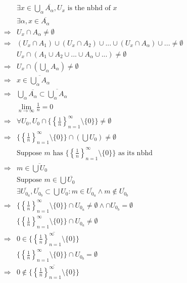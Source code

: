 \documentclass{article}
\begin{document}
\begin{equation*}
    \begin{split}
        &\exists x\in \bigcup_\alpha\overline{A_\alpha},U_x\text{ is the nbhd of }x\\
        &\exists \alpha,x\in \overline{A_\alpha}\\
        \Rightarrow&U_x\cap A_\alpha\ne\emptyset\\
        \Rightarrow&(U_x\cap A_1)\cup(U_x\cap A_2)\cup...\cup(U_x\cap A_\alpha)\cup...\ne\emptyset\\
        &U_x\cap(A_1\cup A_2\cup...\cup A_\alpha\cup ...)\ne\emptyset\\
        \Rightarrow&U_x\cap(\bigcup_\alpha A_\alpha)\ne\emptyset\\
        \Rightarrow&x\in\overline{\bigcup_\alpha A_\alpha}\\
        \Rightarrow&\bigcup_\alpha\overline{A_\alpha}\subset\overline{\bigcup_\alpha A_\alpha}\\
        &\lim_{n\rightarrow\infty}\frac{1}{n}=0\\
        \Rightarrow&\forall U_0,U_0\cap\{\left\{\frac{1}{n}\right\}^{\infty}_{n=1}\setminus\{0\}\}\ne\emptyset\\
        \Rightarrow&\{\left\{\frac{1}{n}\right\}^{\infty}_{n=1}\setminus\{0\}\}\cap(\bigcup U_0)\ne\emptyset\\
        &\text{Suppose } m\text{ has }\{\left\{\frac{1}{n}\right\}^{\infty}_{n=1}\setminus\{0\}\}\text{ as its nbhd}\\
        \Rightarrow&m\in \overline{\bigcup U_0}\\
        &\text{Suppose }m\in \bigcup \overline{U_0}\\
        &\exists \overline{U_{0_a}},\overline{U_{0_b}}\subset \bigcup U_0:m\in \overline{U_{0_a}} \land m\notin \overline{U_{0_b}}\\
        \Rightarrow&\{\left\{\frac{1}{n}\right\}^{\infty}_{n=1}\setminus\{0\}\}\cap U_{0_a}\ne\emptyset\land \cap U_{0_b}=\emptyset\\
        &\{\left\{\frac{1}{n}\right\}^{\infty}_{n=1}\setminus\{0\}\}\cap U_{0_a}\ne\emptyset\\
        \Rightarrow&0\in \overline{\{\left\{\frac{1}{n}\right\}^{\infty}_{n=1}\setminus\{0\}\}}\\
        &\{\left\{\frac{1}{n}\right\}^{\infty}_{n=1}\setminus\{0\}\}\cap U_{0_b}=\emptyset\\
        \Rightarrow&0\notin \overline{\{\left\{\frac{1}{n}\right\}^{\infty}_{n=1}\setminus\{0\}\}}\\
    \end{split}
\end{equation*}
\end{document}
